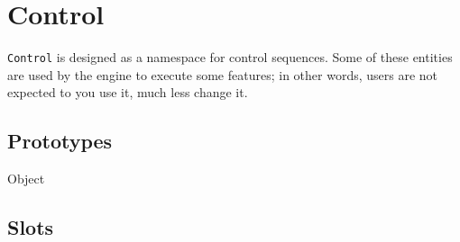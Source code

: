 \section{Control}

\lstinline|Control| is designed as a namespace for control sequences.
Some of these entities are used by the \urbi engine to execute some
\us features; in other words, users are not expected to you use it,
much less change it.

\subsection{Prototypes}

\begin{refObjects}
\item[Object]
\end{refObjects}

\subsection{Slots}

